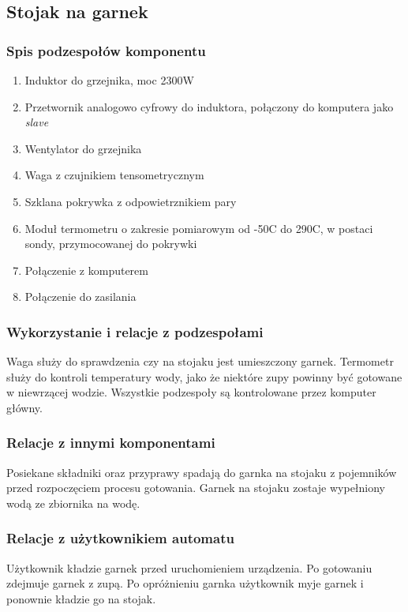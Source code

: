 \documentclass[12pt,a4paper,notitlepage]{article}
\begin{document}
\subsection{Stojak na garnek}
\subsubsection{Spis podzespołów komponentu}
\begin{enumerate}
  \item Induktor do grzejnika, moc 2300W
  \item Przetwornik analogowo cyfrowy do induktora, połączony do komputera jako \emph{slave}
  \item Wentylator do grzejnika
  \item Waga z czujnikiem tensometrycznym
  \item Szklana pokrywka z odpowietrznikiem pary
  \item Moduł termometru o zakresie pomiarowym od -50\degree C do 290\degree C, w postaci sondy, przymocowanej do pokrywki
  \item Połączenie z komputerem
  \item Połączenie do zasilania
\end{enumerate}
 
\subsubsection{Wykorzystanie i relacje z podzespołami}
Waga służy do sprawdzenia czy na stojaku jest umieszczony garnek. Termometr służy do kontroli temperatury wody, jako że niektóre zupy powinny być gotowane w niewrzącej wodzie. Wszystkie podzespoły są kontrolowane przez komputer główny.

\subsubsection{Relacje z innymi komponentami}
Posiekane składniki oraz przyprawy spadają do garnka na stojaku z pojemników przed rozpoczęciem procesu gotowania. Garnek na stojaku zostaje wypełniony wodą ze zbiornika na wodę.

\subsubsection{Relacje z użytkownikiem automatu}
Użytkownik kładzie garnek przed uruchomieniem urządzenia. Po gotowaniu zdejmuje garnek z zupą. Po opróżnieniu garnka użytkownik myje garnek i ponownie kładzie go na stojak.
\end{document}
